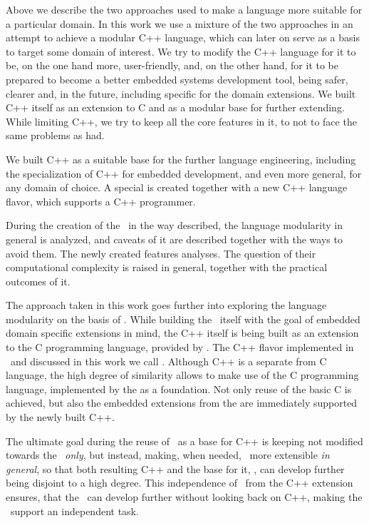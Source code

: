 

Above we describe the two approaches used to make a language more suitable for a particular domain. 
In this work we use a mixture of the two approaches in an  attempt to achieve a modular C++ language, 
which can later on serve as a basis to target some domain of interest. We try to modify the C++ language 
for it to be, on the one hand more, user-friendly, and, on the other hand, for it to be prepared to become 
a better embedded systems development tool, being safer, clearer and, in the future, including specific
for the domain extensions. We built C++ itself as an extension to C and as a modular base for further extending. While limiting 
C++, we try to keep all the core features in it, to not to face the same problems as  had.

We built C++ as a suitable base for the further language engineering, including the specialization  of C++ for embedded development, 
and even more general, for any domain of choice. A special  is created together with a new C++ language flavor, which supports 
a C++ programmer.

During the creation of the \cpppl\ in the way described, the language modularity in general is analyzed, and caveats of it
are described together with the ways to avoid them. The newly created  features analyses. The question of their
computational complexity is raised in general, together with the practical outcomes of it.

The approach taken in this work goes further into exploring the language modularity on the basis of \jbmps. While building 
the \cpppl\ itself  with the goal of embedded domain specific extensions in mind, the C++ itself is being built as 
an extension to the C programming language, provided by . The C++ flavor implemented in \jbmps\ and discussed in this 
work we call \pcpp. Although C++ is a separate from C language, the high degree of similarity allows to make use of the C programming language,
implemented by the  as a foundation. Not only reuse of the basic C is achieved, but also the embedded extensions from
the  are immediately supported by the newly built C++.

The ultimate goal during the reuse of \mbdr\ as a base for C++ is keeping 
  not modified towards the \cpppl\ \emph{only}, but instead, making, when needed, \mbeddr\  more extensible \emph{in general}, 
so that both resulting C++ and the base for it, \mbdr,  can develop further being disjoint to a high degree.
This independence of \mbdr\ from the C++ extension ensures, that the \mbdp\ can develop further without looking back 
on C++, making the \pcpp\ support an independent task.

